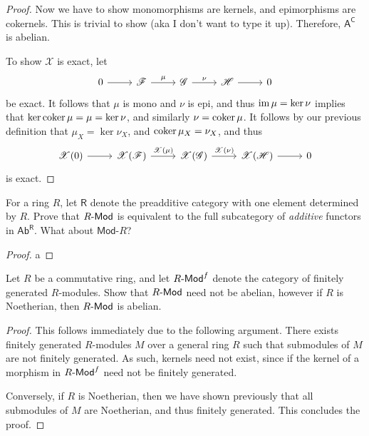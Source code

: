 \documentclass[11pt]{report}
\begin{document}
\begin{proof}
	Now we have to show monomorphisms are kernels, and epimorphisms are cokernels. This is trivial to show (aka I don't want to type it up). Therefore, $\mathsf{A} ^{\mathsf{C} } $ is abelian.

	To show $\mathscr{X} $ is exact, let
	\[\begin{tikzcd}[row sep = 2.5em, column sep = 2.5em]
		0\arrow[r]&\mathscr{F} \arrow[r, "\mu "]&\mathscr{G} \arrow[r, "\nu "]&\mathscr{H} \arrow[r]&0
	\end{tikzcd}\]
	be exact. It follows that $\mu $ is mono and $\nu $ is epi, and thus $\operatorname{im} \mu =\ker \nu $ implies that $\ker \operatorname{coker} \mu =\mu =\ker \nu $, and similarly $\nu =\operatorname{coker} \mu $. It follows by our previous definition that $\mu_X=\ker \nu _X$, and $\operatorname{coker} \mu _X=\nu _X$, and thus
	\[\begin{tikzcd}[row sep = 2.5em, column sep = 2.5em]
		\mathscr{X}(0)\arrow[r]&\mathscr{X} (\mathscr{F} )\arrow[r, "\mathscr{X} (\mu )"]&\mathscr{X} (\mathscr{G} )\arrow[r, "\mathscr{X} (\nu )"]&\mathscr{X} (\mathscr{H} )\arrow[r]&0
	\end{tikzcd}\]
	is exact.
\end{proof}
\begin{exercise}
	For a ring $R$, let $\mathsf{R} $ denote the preadditive category with one element determined by $R$. Prove that $R\text{-}\mathsf{Mod} $ is equivalent to the full subcategory of \emph{additive} functors in $\mathsf{Ab} ^{\mathsf{R} } $. What about $\mathsf{Mod} $-$R$?
\end{exercise}
\begin{proof}
	a
\end{proof}
\begin{exercise}
	Let $R$ be a commutative ring, and let $R\text{-}\mathsf{Mod} ^{f} $ denote the category of finitely generated $R$-modules. Show that $R\text{-}\mathsf{Mod} $ need not be abelian, however if $R$ is Noetherian, then $R\text{-}\mathsf{Mod} $ is abelian.
\end{exercise}
\begin{proof}
	This follows immediately due to the following argument. There exists finitely generated $R$-modules $M$ over a general ring $R$ such that submodules of $M$ are not finitely generated. As such, kernels need not exist, since if the kernel of a morphism in $R\text{-}\mathsf{Mod} ^{f} $ need not be finitely generated.

	Conversely, if $R$ is Noetherian, then we have shown previously that all submodules of $M$ are Noetherian, and thus finitely generated. This concludes the proof.
\end{proof}
\end{document}
